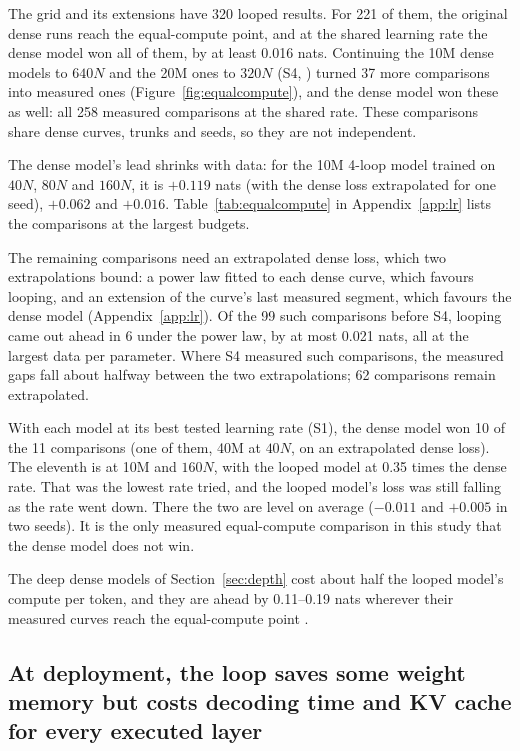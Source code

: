The grid and its extensions have 320 looped results. For 221 of them, the original dense runs reach the equal-compute
point, and at the shared learning rate the dense model won all of them, by at least 0.016 nats. Continuing the 10M dense models to $640N$ and the 20M ones to $320N$ (S4, )
turned 37 more comparisons into measured ones (Figure~\ref{fig:equalcompute}), and the dense model won these as well:
all 258 measured comparisons at the shared rate. These comparisons share dense curves, trunks and seeds, so they are not
independent.

The dense model's lead shrinks with data: for the 10M 4-loop model trained on $40N$, $80N$ and $160N$, it is $+0.119$ nats (with the dense loss extrapolated for one seed), $+0.062$ and $+0.016$. Table~\ref{tab:equalcompute} in Appendix~\ref{app:lr} lists the comparisons at the
largest budgets.

The remaining comparisons need an extrapolated dense loss, which two extrapolations bound: a power law fitted to
each dense curve, which favours looping, and an extension of the curve's last measured segment, which favours the dense model (Appendix~\ref{app:lr}). Of the 99 such comparisons before S4, looping came out ahead in 6 under the
power law, by at most 0.021 nats, all at the largest data per parameter. Where S4 measured such comparisons, the measured gaps fall about
halfway between the two extrapolations; 62 comparisons remain extrapolated.

With each model at its best tested learning rate (S1),
the dense model won 10 of the 11 comparisons (one of them, 40M at $40N$, on an extrapolated dense loss). The eleventh is
at 10M and $160N$, with the looped model at 0.35 times the dense rate. That was the lowest rate tried, and the looped
model's loss was still falling as the rate went down. There the two are level on average ($-0.011$ and $+0.005$ in two
seeds). It is the only measured equal-compute comparison in this study that the dense model does not win.

The deep dense models of Section~\ref{sec:depth} cost about half the looped model's compute per token, and they are ahead by 0.11--0.19 nats wherever their measured curves reach the equal-compute point .

\subsection{At deployment, the loop saves some weight memory but costs decoding time and KV cache for every executed
layer}
\label{sec:cost}

